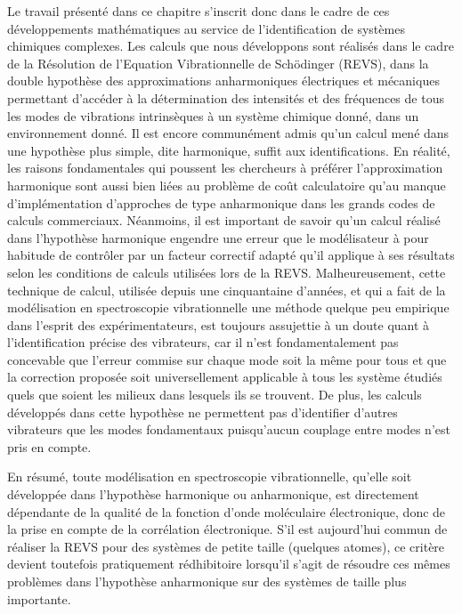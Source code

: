 Le travail présenté dans ce chapitre s'inscrit donc dans le cadre de ces développements mathématiques au service de l'identification de systèmes chimiques complexes. Les calculs que nous développons sont réalisés dans le cadre de la Résolution de l'Equation Vibrationnelle de Sch\"{o}dinger (REVS), dans la double hypothèse des approximations anharmoniques électriques et mécaniques permettant d'accéder à la détermination des intensités et des fréquences de tous les modes de vibrations intrinsèques à un système chimique donné, dans un environnement donné. Il est encore communément admis qu'un calcul mené dans une hypothèse plus simple, dite harmonique, suffit aux identifications. En réalité, les raisons fondamentales qui poussent les chercheurs à préférer l'approximation harmonique sont aussi bien liées au problème de coût calculatoire qu'au manque d'implémentation d'approches de type anharmonique dans les grands codes de calculs commerciaux. Néanmoins, il est important de savoir qu'un calcul réalisé dans l'hypothèse harmonique engendre une erreur que le modélisateur à pour habitude de \og contrôler \fg{} par un facteur correctif adapté qu'il applique à ses résultats selon les conditions de calculs utilisées lors de la REVS. Malheureusement, cette technique de calcul, utilisée depuis une cinquantaine d'années, et qui a fait de la modélisation en spectroscopie vibrationnelle une méthode quelque peu empirique dans l'esprit des expérimentateurs, est toujours assujettie à un doute quant à l'identification précise des vibrateurs, car il n'est fondamentalement pas concevable que l'erreur commise sur chaque mode soit la même pour tous et que la correction proposée soit universellement applicable à tous les système étudiés quels que soient les milieux dans lesquels ils se trouvent. De plus, les calculs développés dans cette hypothèse ne permettent pas d'identifier d'autres vibrateurs que les modes fondamentaux puisqu'aucun couplage entre modes n'est pris en compte.

En résumé, toute modélisation en spectroscopie vibrationnelle, qu’elle soit développée dans l’hypothèse harmonique ou anharmonique, est directement dépendante de la qualité de la fonction d’onde moléculaire électronique, donc de la prise en compte de la corrélation électronique. S’il est aujourd’hui commun de réaliser la REVS pour des systèmes de petite taille (quelques atomes), ce critère devient toutefois pratiquement rédhibitoire lorsqu'il s'agit de résoudre ces mêmes problèmes dans l’hypothèse anharmonique sur des systèmes de taille plus importante.

